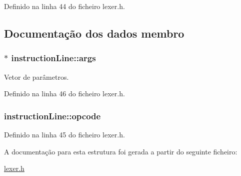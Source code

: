 Definido na linha 44 do ficheiro lexer.\-h.



\subsection{Documentação dos dados membro}
\hypertarget{structinstruction_line_ab6b4be43f89da78d09a9469f952435c7}{
\subsubsection[{args}]{$\ast$ instruction\-Line\-::args}}\label{structinstruction_line_ab6b4be43f89da78d09a9469f952435c7}


Vetor de parâmetros. 



Definido na linha 46 do ficheiro lexer.\-h.

\hypertarget{structinstruction_line_a309feca274873683d12f90cf0bd81780}{
\subsubsection[{opcode}]{ instruction\-Line\-::opcode}}\label{structinstruction_line_a309feca274873683d12f90cf0bd81780}


Definido na linha 45 do ficheiro lexer.\-h.



A documentação para esta estrutura foi gerada a partir do seguinte ficheiro\-:\begin{DoxyCompactItemize}
\item 
\hyperlink{lexer_8h}{lexer.\-h}\end{DoxyCompactItemize}
